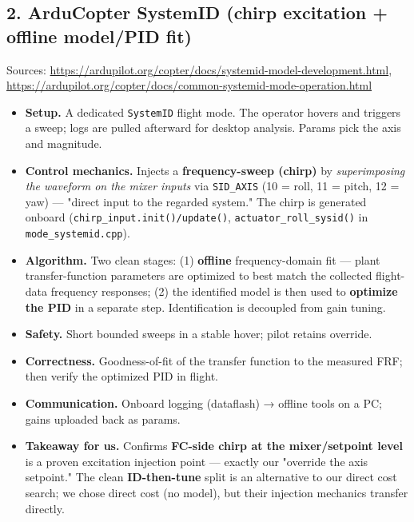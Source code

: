 \documentclass[
  11pt,
]{article}
\providecommand{\tightlist}{%
  \setlength{\itemsep}{0pt}\setlength{\parskip}{0pt}}
\begin{document}
\hypertarget{2-arducopter-systemid-chirp-excitation--offline-modelpid-fit}{%
\subsection{2. ArduCopter SystemID (chirp excitation + offline model/PID
fit)}\label{2-arducopter-systemid-chirp-excitation--offline-modelpid-fit}}

Sources:
\url{https://ardupilot.org/copter/docs/systemid-model-development.html},
\url{https://ardupilot.org/copter/docs/common-systemid-mode-operation.html}

\begin{itemize}
\tightlist
\item
  \textbf{Setup.} A dedicated \texttt{SystemID} flight mode. The
  operator hovers and triggers a sweep; logs are pulled afterward for
  desktop analysis. Params pick the axis and magnitude.
\item
  \textbf{Control mechanics.} Injects a \textbf{frequency-sweep (chirp)}
  by \emph{superimposing the waveform on the mixer inputs} via
  \texttt{SID\_AXIS} (10 = roll, 11 = pitch, 12 = yaw) --- "direct input
  to the regarded system." The chirp is generated onboard
  (\texttt{chirp\_input.init()/update()},
  \texttt{actuator\_roll\_sysid()} in \texttt{mode\_systemid.cpp}).
\item
  \textbf{Algorithm.} Two clean stages: (1) \textbf{offline}
  frequency-domain fit --- plant transfer-function parameters are
  optimized to best match the collected flight- data frequency
  responses; (2) the identified model is then used to \textbf{optimize
  the PID} in a separate step. Identification is decoupled from gain
  tuning.
\item
  \textbf{Safety.} Short bounded sweeps in a stable hover; pilot retains
  override.
\item
  \textbf{Correctness.} Goodness-of-fit of the transfer function to the
  measured FRF; then verify the optimized PID in flight.
\item
  \textbf{Communication.} Onboard logging (dataflash) → offline tools on
  a PC; gains uploaded back as params.
\item
  \textbf{Takeaway for us.} Confirms \textbf{FC-side chirp at the
  mixer/setpoint level} is a proven excitation injection point ---
  exactly our "override the axis setpoint." The clean
  \textbf{ID-then-tune} split is an alternative to our direct cost
  search; we chose direct cost (no model), but their injection mechanics
  transfer directly.
\end{itemize}
\end{document}
